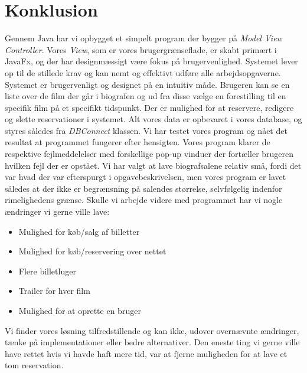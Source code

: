 \documentclass[final]{report}
\begin{document}
\chapter{Konklusion}
Gennem Java har vi opbygget et simpelt program der bygger på \emph{Model View Controller}. Vores \emph{View}, som er vores brugergrænseflade, er skabt primært i JavaFx, og der har designmæssigt være fokus på brugervenlighed. 
Systemet lever op til de stillede krav og kan nemt og effektivt udføre alle arbejdsopgaverne. Systemet er brugervenligt og designet på en intuitiv måde. Brugeren kan se en liste over de film der går i biografen og ud fra disse vælge en forestilling til en specifik film på et specifikt tidspunkt. Der er mulighed for at reservere, redigere og slette reservationer i systemet. Alt vores data er opbevaret i vores database, og styres således fra \emph{DBConnect} klassen. Vi har testet vores program og nået det resultat at programmet fungerer efter hensigten. Vores program klarer de respektive fejlmeddelelser med forskellige pop-up vinduer der fortæller brugeren hvilken fejl der er opstået. Vi har valgt at lave biografsalene relativ små, fordi det var hvad der var efterspurgt i opgavebeskrivelsen, men vores program er lavet således at der ikke er begrænsning på salendes størrelse, selvfølgelig indenfor rimelighedens grænse. Skulle vi arbejde videre med programmet har vi nogle ændringer vi gerne ville lave:

\begin{itemize}
\item Mulighed for køb/salg af billetter
\item Mulighed for køb/reservering over nettet
\item Flere billetluger
\item Trailer for hver film
\item Mulighed for at oprette en bruger
\end{itemize}

Vi finder vores løsning tilfredstillende og kan ikke, udover overnævnte ændringer, tænke på implementationer eller bedre alternativer. Den eneste ting vi gerne ville have rettet hvis vi havde haft mere tid, var at fjerne muligheden for at lave et tom reservation. 

\printbibliography

\listoffigures
\end{document}
